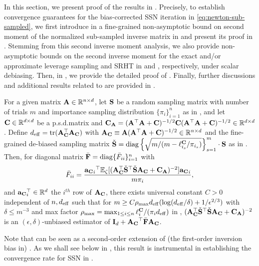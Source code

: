 \documentclass[11pt,a4paper]{article}
\begin{document}
In this section, we present proof of the results in .
Precisely, to establish convergence guarantees for the bias-corrected SSN iteration in \eqref{eq:newton-sub-sampled}, we first introduce in  a fine-grained non-asymptotic bound on second moment of the normalized sub-sampled inverse matrix in  and present its proof in . 
Stemming from this second inverse moment analysis, we also provide non-asymptotic bounds on the second inverse moment for the exact and/or approximate leverage sampling and SRHT in  and , respectively, under scalar debiasing.
Then, in , we provide the detailed proof of . 
Finally, further discussions and additional results related to  are provided in .




\begin{proposition}\label{prop:sec.moment} 
For a given  matrix $\A\in \RR^{n\times d}$, let $\S$ be a random sampling  matrix  with number of trials $m$ and importance sampling distribution $\{ \pi_i \}_{i=1}^n$ as in , and let $\C\in \RR^{d\times d}$ be a p.s.d.\@ matrix and $\C_{\A}=(\A^\top\A+\C)^{-1/2}\C(\A^\top\A+\C)^{-1/2} \in \RR^{d \times d}$. 
Define  $d_{\eff}=\tr(\A_\C^\top\A_\C)$ with $\A_\C \equiv \A(\A^\top \A+\C)^{-1/2} \in \RR^{n \times d}$ 
and the fine-grained de-biased sampling matrix $\check{\S} =\diag\left\{ \sqrt{ m/(m - \ell^\C_{i_s}/\pi_{i_s} ) }\right\}_{s=1}^m  \cdot \S $ as in .
Then, for diagonal matrix $\bar \F=\diag\{\bar F_{ii}\}^n_{i=1}$ with
\begin{equation*}
    \bar F_{ii}= \frac{{{\ba_{\C}}_i}^\top\EE_{\zeta}[(\A_{\C}^\top \check{\S}^\top \check{\S}\A_{\C}+ \C_{\A} )^{-2}]{\ba_{\C}}_i}{m\pi_i},
\end{equation*}
and  ${\ba_{\C}}_i^\top \in\RR^d$  the $i^{th}$ row of $\A_{\C}$, there exists universal constant $C > 0$ independent of $n,d_{\eff}$ such that for $m\geq C\rho_{\max} d_{\eff}(\log(d_{\eff}/\delta )+ 1/\epsilon^{2/3})$ with $\delta\leq m^{-3}$ and max  factor $\rho_{\max} = \max_{1\leq i \leq n}\ell^{\C}_i/(\pi_id_{\eff})$ in , $(\A_{\C}^\top  \check{\S}^\top \check{\S}\A_{\C} + \C_{\A} )^{-2}$ is  an $(\epsilon,\delta)$-unbiased estimator of $\I_{d}+{\A_{\C}}^\top\bar \F{\A_{\C}}$. 
\end{proposition}
Note that  can be seen as a second-order extension of (the first-order inversion bias in)  .
As we shall see below in , this result is instrumental in establishing the convergence rate for SSN in . 
\end{document}

